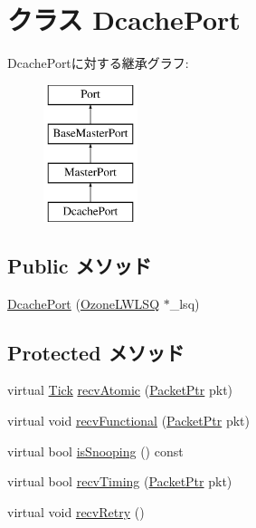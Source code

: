 \hypertarget{classOzoneLWLSQ_1_1DcachePort}{
\section{クラス DcachePort}
\label{classOzoneLWLSQ_1_1DcachePort}
}
DcachePortに対する継承グラフ:\begin{figure}[H]
\begin{center}
\leavevmode
\includegraphics[height=4cm]{classOzoneLWLSQ_1_1DcachePort}
\end{center}
\end{figure}
\subsection*{Public メソッド}
\begin{DoxyCompactItemize}
\item 
\hyperlink{classOzoneLWLSQ_1_1DcachePort_a5f7643d592d525aed12c1a80f2d9399e}{DcachePort} (\hyperlink{classOzoneLWLSQ}{OzoneLWLSQ} $\ast$\_\-lsq)
\end{DoxyCompactItemize}
\subsection*{Protected メソッド}
\begin{DoxyCompactItemize}
\item 
virtual \hyperlink{base_2types_8hh_a5c8ed81b7d238c9083e1037ba6d61643}{Tick} \hyperlink{classOzoneLWLSQ_1_1DcachePort_a5f0b4c4a94f6b0053f9d7a4eb9c2518a}{recvAtomic} (\hyperlink{classPacket}{PacketPtr} pkt)
\item 
virtual void \hyperlink{classOzoneLWLSQ_1_1DcachePort_aeefa907fb6d6a787e6dab90e8138ea90}{recvFunctional} (\hyperlink{classPacket}{PacketPtr} pkt)
\item 
virtual bool \hyperlink{classOzoneLWLSQ_1_1DcachePort_a32602a6a3c3d66a639455036d6c08dd6}{isSnooping} () const 
\item 
virtual bool \hyperlink{classOzoneLWLSQ_1_1DcachePort_aaeef0f6f81d00988bb7b8ba8fe56049e}{recvTiming} (\hyperlink{classPacket}{PacketPtr} pkt)
\item 
virtual void \hyperlink{classOzoneLWLSQ_1_1DcachePort_a29cb5a4f98063ce6e9210eacbdb35298}{recvRetry} ()
\end{DoxyCompactItemize}

